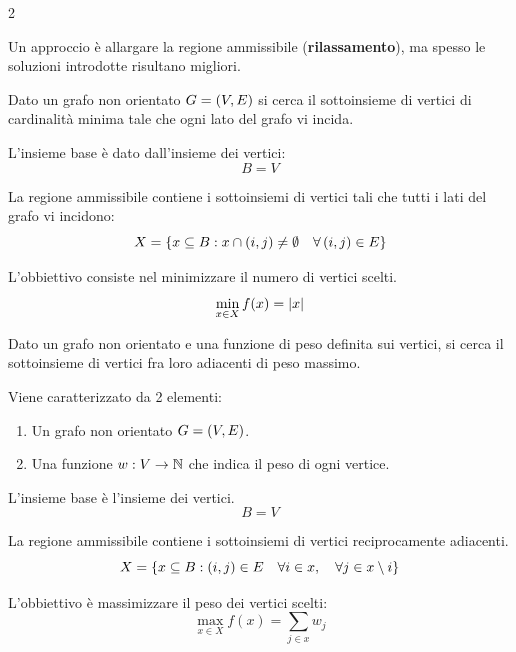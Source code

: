 \documentclass[\main/main.tex]{subfiles}
\begin{document}
\begin{multicols}{2}
\begin{observation}
        Un approccio è allargare la regione ammissibile (\textbf{rilassamento}), ma spesso le soluzioni introdotte risultano migliori.
    \end{observation}
    \begin{problem}
        Dato un grafo non orientato \(G = \left(V, E\right)\) si cerca il sottoinsieme di vertici di cardinalità minima tale che ogni lato del grafo vi incida.
    \end{problem}
    \begin{definition}
        L'insieme base è dato dall'insieme dei vertici:
        \[
            B = V
        \]
    \end{definition}
    \begin{definition}
        La regione ammissibile contiene i sottoinsiemi di vertici tali che tutti i lati del grafo vi incidono:
        \[
            X = \left\{x \subseteq B: x \cap \left(i,j\right) \neq \emptyset \quad \forall \left(i,j\right) \in E\right\}
        \]
    \end{definition}
    \begin{definition}
        L'obbiettivo consiste nel minimizzare il numero di vertici scelti.
        \[
            \min_{x \in X} f(x) = \left\lvert x\right\rvert
        \]
    \end{definition}
    \begin{problem}
        Dato un grafo non orientato e una funzione di peso definita sui vertici, si cerca il sottoinsieme di vertici fra loro adiacenti di peso massimo.
        
        Viene caratterizzato da 2 elementi:
        \begin{enumerate}
            \item Un grafo non orientato \(G = \left(V, E\right)\).
            \item Una funzione \(w: V \rightarrow \mathbb{N}\) che indica il peso di ogni vertice.
        \end{enumerate}
    \end{problem}
    \begin{definition}
        L'insieme base è l'insieme dei vertici.
        \[
            B = V
        \]
    \end{definition}
    \begin{definition}
        La regione ammissibile contiene i sottoinsiemi di vertici reciprocamente adiacenti.
        \[
            X = \left\{x \subseteq B: \left(i,j\right) \in E \quad \forall i \in x, \quad \forall j \in x \setminus {i}\right\}
        \]
    \end{definition}
    \begin{definition}
        L'obbiettivo è massimizzare il peso dei vertici scelti:
        \[
            \max_{x \in X} f(x) = \sum_{j \in x} w_j
        \]
    \end{definition}
\end{multicols}
\end{document}
